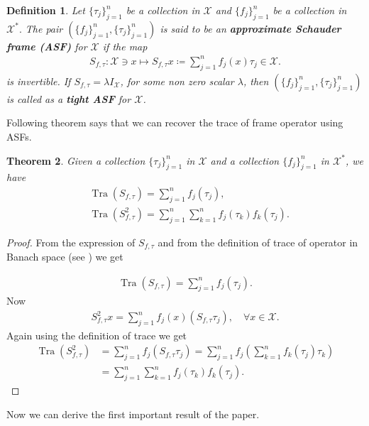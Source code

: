 \documentclass{amsart}
\newtheorem{theorem}{Theorem}[section]
\newtheorem{definition}[theorem]{Definition}
\begin{document}
\begin{definition}\cite{FREEMANODELL, THOMAS}
Let $\{\tau_j\}_{j=1}^n$ be a collection in  $\mathcal{X}$ and 	$\{f_j\}_{j=1}^n$ be a collection in  $\mathcal{X}^*.$ The pair $ (\{f_j \}_{j=1}^n, \{\tau_j \}_{j=1}^n) $ is said to be an \textbf{approximate  Schauder frame (ASF)} for $\mathcal{X}$ if the map 
\begin{align*}
	S_{f, \tau}:\mathcal{X}\ni x \mapsto S_{f, \tau}x\coloneqq \sum_{j=1}^n
	f_j(x)\tau_j \in\mathcal{X}.
\end{align*}
is invertible. If $S_{f, \tau}=\lambda I_\mathcal{X}$, for some non zero scalar $\lambda$, then $ (\{f_j \}_{j=1}^n, \{\tau_j \}_{j=1}^n) $ is called as a \textbf{tight ASF} for $\mathcal{X}$. 
\end{definition} 
Following theorem says that we can recover the trace of  frame operator using ASFs.
\begin{theorem}\label{DFBS}
Given a collection $\{\tau_j\}_{j=1}^n$ in $\mathcal{X}$  and 	  a collection $\{f_j\}_{j=1}^n$  in  $\mathcal{X}^*$, we have 
\begin{align*}
&\operatorname{Tra}(S_{f,\tau})=\sum_{j=1}^nf_j(\tau_j), \\
& \operatorname{Tra}(S^2_{f,\tau})=\sum_{j=1}^n\sum_{k=1}^nf_j(\tau_k)f_k(\tau_j).
\end{align*}	
\end{theorem}
\begin{proof}
From the expression of $S_{f,\tau}$ and from the  definition of trace of operator in Banach space (see \cite{JOHNSONSZANKOWSKI}) we get

\begin{align*}
\operatorname{Tra}(S_{f,\tau})=\sum_{j=1}^nf_j(\tau_j).
\end{align*}
Now 
\begin{align*}
S_{f,\tau}^2x=\sum_{j=1}^n
f_j(x)(S_{f,\tau}\tau_j), \quad \forall x \in \mathcal{X}.
\end{align*}
 Again using the definition of trace we get 
  \begin{align*}
  \operatorname{Tra}(S^2_{f,\tau})&=\sum_{j=1}^nf_j(S_{f,\tau}\tau_j)=\sum_{j=1}^nf_j\left(\sum_{k=1}^nf_k(\tau_j)\tau_k\right)\\
  &=\sum_{j=1}^n\sum_{k=1}^nf_j(\tau_k)f_k(\tau_j).
  \end{align*}
\end{proof}
Now we can derive the first important result of the paper.
\end{document}

